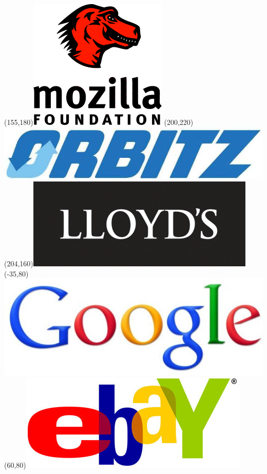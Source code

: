 \begin{frame}
\Put(155,180){\includegraphics[scale=.9]{../common/pics/R_using_logos/mozilla}}
\Put(200,220){\includegraphics[scale=.1]{../common/pics/R_using_logos/orbitz}}
\Put(204,160){\includegraphics[scale=.16]{../common/pics/R_using_logos/lloyds}}
\Put(-35,80){\includegraphics[scale=.12]{../common/pics/R_using_logos/google}}
\Put(60,80){\includegraphics[scale=.12]{../common/pics/R_using_logos/ebay}}

\end{frame}
